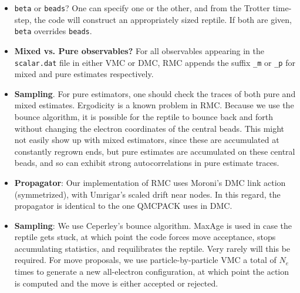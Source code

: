 \begin{itemize}
\item \texttt{beta} or \texttt{beads}?  One can specify one or the other, and from the Trotter time-step, the code will construct an appropriately sized reptile.  If both are given, \texttt{beta} overrides \texttt{beads}.  

\item \textbf{Mixed vs. Pure observables?}  For all observables appearing in the \texttt{scalar.dat} file in either VMC or DMC, RMC appends the suffix \texttt{\_m} or \texttt{\_p} for mixed and pure estimates respectively.

\item \textbf{Sampling}.  For pure estimators, one should check the traces of both pure and mixed estimates.  Ergodicity is a known problem in RMC.  Because we use the bounce algorithm, it is possible for the reptile to bounce back and forth without changing the electron coordinates of the central beads.  This might not easily show up with mixed estimators, since these are accumulated at constantly regrown ends, but pure estimates are accumulated on these central beads, and so can exhibit strong autocorrelations in pure estimate traces.  

\item \textbf{Propagator}:  Our implementation of RMC uses Moroni's DMC link action (symmetrized), with Umrigar's scaled drift near nodes.  In this regard, the propagator is identical to the one QMCPACK uses in DMC.  

\item \textbf{Sampling}:  We use Ceperley's bounce algorithm.  MaxAge is used in case the reptile gets stuck, at which point the code forces move acceptance, stops accumulating statistics, and requilibrates the reptile.  Very rarely will this be required.  For move proposals, we use particle-by-particle VMC a total of $N_e$ times to generate a new all-electron configuration, at which point the action is computed and the move is either accepted or rejected.  
\end{itemize}




